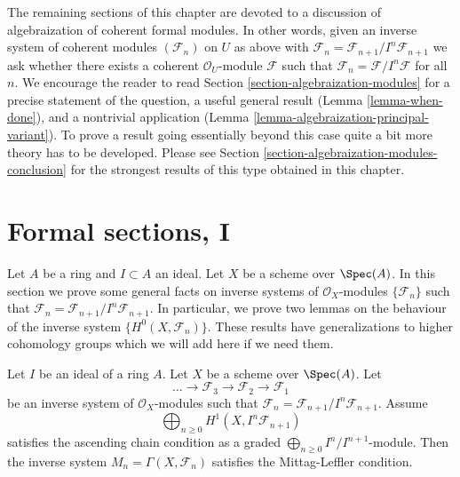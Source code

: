 \medskip\noindent
The remaining sections of this chapter are devoted to a discussion
of algebraization of coherent formal modules. In other words, given
an inverse system of coherent modules $(\mathcal{F}_n)$ on $U$
as above with
$\mathcal{F}_n = \mathcal{F}_{n + 1}/I^n\mathcal{F}_{n + 1}$
we ask whether there exists a coherent $\mathcal{O}_U$-module
$\mathcal{F}$ such that
$\mathcal{F}_n = \mathcal{F}/I^n\mathcal{F}$
for all $n$. We encourage the reader to read
Section \ref{section-algebraization-modules}
for a precise statement of the question, a useful general result
(Lemma \ref{lemma-when-done}), and a nontrivial application
(Lemma \ref{lemma-algebraization-principal-variant}).
To prove a result going essentially beyond this case
quite a bit more theory has to be developed.
Please see Section \ref{section-algebraization-modules-conclusion}
for the strongest results of this type obtained in this chapter.



\section{Formal sections, I}
\label{section-ML-degree-zero}

\noindent
Let $A$ be a ring and $I \subset A$ an ideal. Let $X$ be a scheme
over $\Spec(A)$. In this section we prove some general facts on inverse
systems of $\mathcal{O}_X$-modules $\{\mathcal{F}_n\}$ such that
$\mathcal{F}_n = \mathcal{F}_{n + 1} / I^n \mathcal{F}_{n + 1}$.
In particular, we prove two lemmas on the behaviour of the inverse system
$\{H^0(X, \mathcal{F}_n)\}$.
These results have generalizations to higher cohomology groups
which we will add here if we need them.

\begin{lemma}
\label{lemma-ML-general}
Let $I$ be an ideal of a ring $A$. Let $X$ be a scheme over $\Spec(A)$. Let
$$
\ldots \to \mathcal{F}_3 \to \mathcal{F}_2 \to \mathcal{F}_1
$$
be an inverse system of $\mathcal{O}_X$-modules
such that $\mathcal{F}_n = \mathcal{F}_{n + 1}/I^n\mathcal{F}_{n + 1}$.
Assume
$$
\bigoplus\nolimits_{n \geq 0} H^1(X, I^n\mathcal{F}_{n + 1})
$$
satisfies the ascending chain condition as a graded
$\bigoplus_{n \geq 0} I^n/I^{n + 1}$-module.
Then the inverse system $M_n = \Gamma(X, \mathcal{F}_n)$ satisfies the
Mittag-Leffler condition.
\end{lemma}

